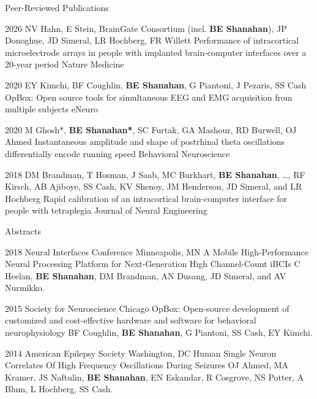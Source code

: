 \documentclass{FormatCV}
\begin{document}

\begin{newSection}{Peer-Reviewed Publications}

\article
{2026}
{NV Hahn, E Stein, BrainGate Consortium (incl. {\bf BE Shanahan}), JP Donoghue, JD Simeral, LR Hochberg, FR Willett}
{Performance of intracortical microelectrode arrays in people with implanted brain-computer interfaces over a 20-year period}
{Nature Medicine}

\article
{2020}
{EY Kimchi, BF Coughlin, {\bf BE Shanahan}, G Piantoni, J Pezaris, SS Cash}
{OpBox: Open source tools for simultaneous EEG and EMG acquisition from multiple subjects}
{eNeuro}

\article
{2020}
{M Ghosh*, {\bf BE Shanahan*}, SC Furtak, GA Mashour, RD Burwell, OJ Ahmed}
{Instantaneous amplitude and shape of postrhinal theta oscillations differentially encode running speed}
{Behavioral Neuroscience}

\article
{2018}
{DM Brandman, T Hosman, J Saab, MC Burkhart, {\bf BE Shanahan}, \ldots, RF Kirsch, AB Ajiboye, SS Cash, KV Shenoy, JM Henderson, JD Simeral, and LR Hochberg}
{Rapid calibration of an intracortical brain-computer interface for people with tetraplegia}
{Journal of Neural Engineering}

\end{newSection}


\begin{newSection}{Abstracts}

\abstractEntryBasic
{2018}
{Neural Interfaces Conference}
{Minneapolis, MN}
{A Mobile High-Performance Neural Processing Platform for Next-Generation High Channel-Count iBCIs}
{C Heelan, {\bf BE Shanahan}, DM Brandman, AN Dusang, JD Simeral, and AV Nurmikko.}

\abstractEntryBasic
{2015}
{Society for Neuroscience}
{Chicago}
{OpBox: Open-source development of customized and cost-effective hardware and software for behavioral neurophysiology}
{BF Coughlin, {\bf BE Shanahan}, G Piantoni, SS Cash, EY Kimchi.}

\abstractEntryBasic
{2014}
{American Epilepsy Society}
{Washington, DC}
{Human Single Neuron Correlates Of High Frequency Oscillations During Seizures}
{OJ Ahmed, MA Kramer, JS Naftulin, {\bf BE Shanahan}, EN Eskandar, R Cosgrove, NS Potter, A Blum, L Hochberg, SS Cash.}

\end{newSection}
\end{document}
